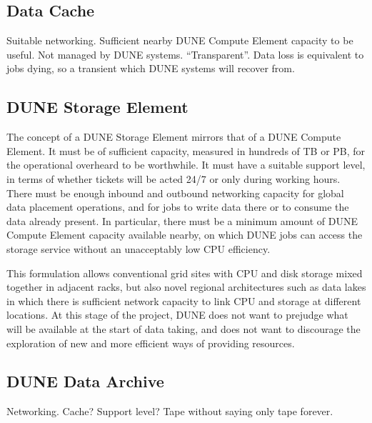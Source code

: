 \subsection{Data Cache}
\label{sec:cm:data_cache}

Suitable networking. Sufficient nearby DUNE Compute Element capacity to be useful. Not managed by DUNE systems. ``Transparent''. Data loss is equivalent to jobs dying, so a transient which DUNE systems will recover from.

\subsection{DUNE Storage Element}
\label{sec:cm:dse}

The concept of a DUNE Storage Element mirrors that of a DUNE Compute Element. It must be of sufficient capacity, measured in hundreds of TB or PB, for the operational overheard to be worthwhile. It must have a suitable support level, in terms of whether tickets will be acted 24/7 or only during working hours. There must be enough inbound and outbound networking capacity for global data placement operations, and for jobs to write data there or to consume the data already present. In particular, there must be a minimum amount of DUNE Compute Element capacity available nearby, on which DUNE jobs can access the storage service without an unacceptably low CPU efficiency. 

This formulation allows conventional grid sites with CPU and disk storage mixed together in adjacent racks, but also novel regional architectures such as data lakes in which there is sufficient network capacity to link CPU and storage at different locations. At this stage of the project, DUNE does not want to prejudge what will be available at the start of data taking, and does not want to discourage the exploration of new and more efficient ways of providing resources.

\subsection{DUNE Data Archive}

Networking. Cache? Support level? Tape without saying only tape forever.

